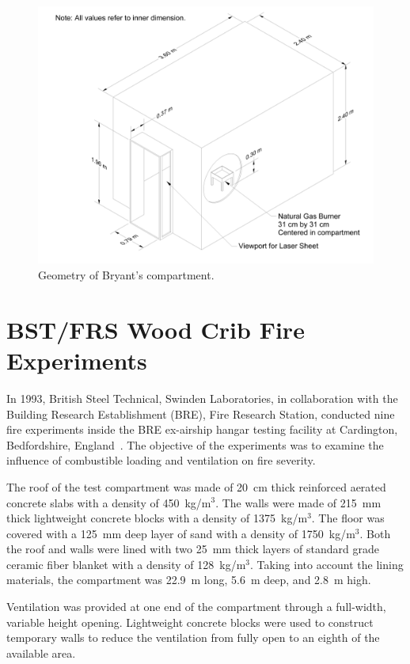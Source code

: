 \begin{figure}[ht]
\includegraphics[width=\textwidth]{FIGURES/Bryant_Doorway/Bryant_Compartment}
\caption[Geometry of Bryant's compartment]{Geometry of Bryant's compartment.}
\label{Bryant_Drawing}
\end{figure}

\section{BST/FRS Wood Crib Fire Experiments}
\label{BST_FRS_wood_cribs_description}

In 1993, British Steel Technical, Swinden Laboratories, in collaboration with the Building Research Establishment (BRE), Fire Research Station, conducted nine fire experiments inside the BRE ex-airship hangar testing facility at Cardington, Bedfordshire, England~\cite{BST_FRS:1994}. The objective of the experiments was to examine the influence of combustible loading and ventilation on fire severity.

The roof of the test compartment was made of 20~cm thick reinforced aerated concrete slabs with a density of 450~kg/m$^3$. The walls were made of 215~mm thick lightweight concrete blocks with a density of 1375~kg/m$^3$. The floor was covered with a 125~mm deep layer of sand with a density of 1750~kg/m$^3$. Both the roof and walls were lined with two 25~mm thick layers of standard grade ceramic fiber blanket with a density of 128~kg/m$^3$. Taking into account the lining materials, the compartment was 22.9~m long, 5.6~m deep, and 2.8~m high.

Ventilation was provided at one end of the compartment through a full-width, variable height opening. Lightweight concrete blocks were used to construct temporary walls to reduce the ventilation from fully open to an eighth of the available area.

